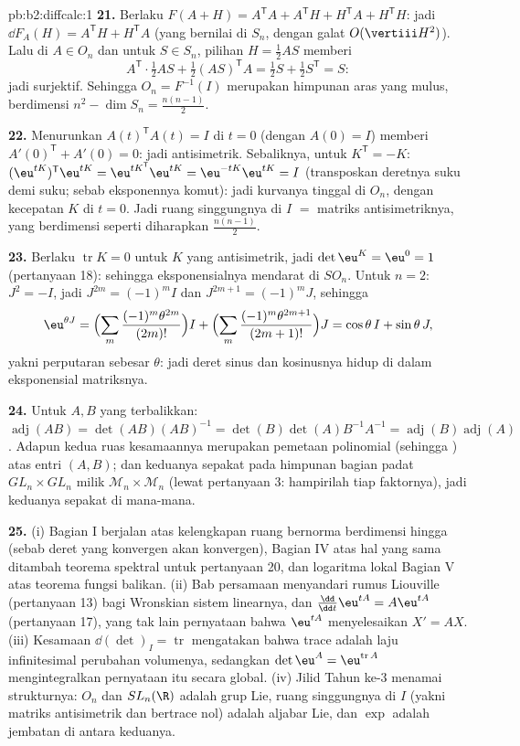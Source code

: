 \begin{solution}{pb:b2:diffcalc:1}
\textbf{21.} Berlaku $F(A + H) = A^{\mathsf T}A + A^{\mathsf T}H +
H^{\mathsf T}A + H^{\mathsf T}H$: jadi $\dd F_A(H) =
A^{\mathsf T}H + H^{\mathsf T}A$ (yang bernilai di $S_n$, dengan galat
$O(\vertiii H^2)$). Lalu di $A \in O_n$ dan untuk $S \in S_n$,
pilihan $H = \frac12AS$ memberi
\[
A^{\mathsf T}\cdot\tfrac12AS + \tfrac12(AS)^{\mathsf T}A
= \tfrac12 S + \tfrac12 S^{\mathsf T} = S :
\]
jadi surjektif. Sehingga $O_n = F^{-1}(I)$ merupakan himpunan aras yang mulus,
berdimensi $n^2 - \dim S_n = \frac{n(n-1)}2$.

\textbf{22.} Menurunkan $A(t)^{\mathsf T}A(t) = I$ di $t
= 0$ (dengan $A(0) = I$) memberi $A'(0)^{\mathsf T} + A'(0) = 0$: jadi
antisimetrik. Sebaliknya, untuk $K^{\mathsf T} = -K$:
$(\eu^{tK})^{\mathsf T}\eu^{tK} = \eu^{tK^{\mathsf T}}
\eu^{tK} = \eu^{-tK}\eu^{tK} = I$ (transposkan deretnya
suku demi suku; sebab eksponennya komut): jadi kurvanya tinggal di $O_n$,
dengan kecepatan $K$ di $t = 0$. Jadi ruang singgungnya di $I$ $=$
matriks antisimetriknya, yang berdimensi seperti diharapkan
$\frac{n(n-1)}2$.

\textbf{23.} Berlaku $\operatorname{tr}K = 0$ untuk $K$ yang antisimetrik,
jadi $\det\eu^K = \eu^0 = 1$ (pertanyaan 18): sehingga eksponensialnya
mendarat di $SO_n$. Untuk $n = 2$: $J^2 = -I$, jadi $J^{2m} =
(-1)^mI$ dan $J^{2m+1} = (-1)^mJ$, sehingga
\[
\eu^{\theta J}
= \Bigl(\sum_m\frac{(-1)^m\theta^{2m}}{(2m)!}\Bigr)I
+ \Bigl(\sum_m\frac{(-1)^m\theta^{2m+1}}{(2m+1)!}\Bigr)J
= \cos\theta\,I + \sin\theta\,J ,
\]
yakni perputaran sebesar $\theta$: jadi deret sinus dan kosinusnya hidup
di dalam eksponensial matriksnya.

\textbf{24.} Untuk $A, B$ yang terbalikkan: $\operatorname{adj}(AB) =
\det(AB)(AB)^{-1} = \det(B)\det(A)B^{-1}A^{-1} =
\operatorname{adj}(B)\operatorname{adj}(A)$. Adapun kedua ruas
kesamaannya merupakan pemetaan polinomial (sehingga ) atas entri
$(A, B)$; dan keduanya sepakat pada himpunan bagian padat $GL_n\times GL_n$
milik $\mathcal M_n\times\mathcal M_n$ (lewat pertanyaan 3: hampirilah
tiap faktornya), jadi keduanya sepakat di mana-mana.

\textbf{25.} (i) Bagian I berjalan atas kelengkapan ruang bernorma
berdimensi hingga (sebab deret yang konvergen  akan konvergen), Bagian IV
atas hal yang sama ditambah teorema spektral untuk pertanyaan 20, dan logaritma
lokal Bagian V atas teorema fungsi balikan. (ii) Bab
persamaan  menyandari rumus Liouville
(pertanyaan 13) bagi Wronskian sistem linearnya, dan
$\frac{\dd}{\dd t}\eu^{tA} = A\eu^{tA}$ (pertanyaan 17), yang tak lain
pernyataan bahwa $\eu^{tA}$ menyelesaikan $X' = AX$. (iii)
Kesamaan $\dd(\det)_I = \operatorname{tr}$ mengatakan bahwa trace adalah
laju infinitesimal perubahan volumenya, sedangkan $\det\eu^A =
\eu^{\operatorname{tr}A}$ mengintegralkan pernyataan itu secara global.
(iv) Jilid Tahun ke-3 menamai strukturnya: $O_n$ dan
$SL_n(\R)$ adalah grup Lie, ruang singgungnya di $I$
(yakni matriks antisimetrik dan bertrace nol) adalah aljabar Lie, dan
$\exp$ adalah jembatan di antara keduanya.

\end{solution}
